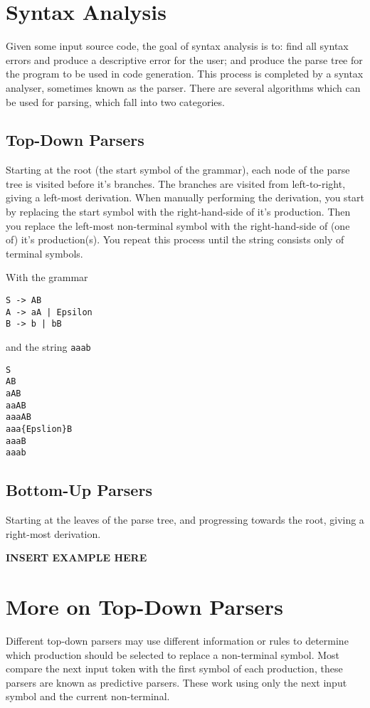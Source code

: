 \section*{Syntax Analysis}

Given some input source code, the goal of syntax analysis is to: find all syntax errors and produce a descriptive error
 for the user; and produce the parse tree for the program to be used in code generation. This process is completed by a
 syntax analyser, sometimes known as the parser. There are several algorithms which can be used for parsing, which fall
 into two categories.

\subsection*{Top-Down Parsers}

Starting at the root (the start symbol of the grammar), each node of the parse tree is visited before it's branches.
 The branches are visited from left-to-right, giving a left-most derivation. When manually performing the derivation,
 you start by replacing the start symbol with the right-hand-side of it's production. Then you replace the left-most
 non-terminal symbol with the right-hand-side of (one of) it's production(s). You repeat this process until the string
 consists only of terminal symbols.

With the grammar
\begin{verbatim}
S -> AB
A -> aA | Epsilon
B -> b | bB
\end{verbatim}
and the string \verb`aaab`
\begin{verbatim}
S
AB
aAB
aaAB
aaaAB
aaa{Epslion}B
aaaB
aaab
\end{verbatim}

\subsection*{Bottom-Up Parsers}

Starting at the leaves of the parse tree, and progressing towards the root, giving a right-most derivation.

\textbf{INSERT EXAMPLE HERE}

\section*{More on Top-Down Parsers}

Different top-down parsers may use different information or rules to determine which production should be selected to
 replace a non-terminal symbol. Most compare the next input token with the first symbol of each production, these
 parsers are known as predictive parsers. These work using only the next input symbol and the current non-terminal.


